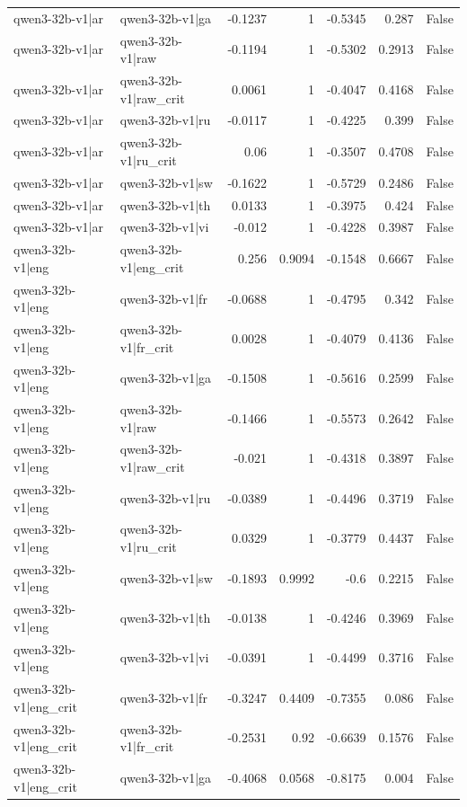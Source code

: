 \begin{table}
\begin{tabular}{l l r r r r l}
qwen3-32b-v1|ar & qwen3-32b-v1|ga & -0.1237 & 1 & -0.5345 & 0.287 & False \\
qwen3-32b-v1|ar & qwen3-32b-v1|raw & -0.1194 & 1 & -0.5302 & 0.2913 & False \\
qwen3-32b-v1|ar & qwen3-32b-v1|raw_crit & 0.0061 & 1 & -0.4047 & 0.4168 & False \\
qwen3-32b-v1|ar & qwen3-32b-v1|ru & -0.0117 & 1 & -0.4225 & 0.399 & False \\
qwen3-32b-v1|ar & qwen3-32b-v1|ru_crit & 0.06 & 1 & -0.3507 & 0.4708 & False \\
qwen3-32b-v1|ar & qwen3-32b-v1|sw & -0.1622 & 1 & -0.5729 & 0.2486 & False \\
qwen3-32b-v1|ar & qwen3-32b-v1|th & 0.0133 & 1 & -0.3975 & 0.424 & False \\
qwen3-32b-v1|ar & qwen3-32b-v1|vi & -0.012 & 1 & -0.4228 & 0.3987 & False \\
qwen3-32b-v1|eng & qwen3-32b-v1|eng_crit & 0.256 & 0.9094 & -0.1548 & 0.6667 & False \\
qwen3-32b-v1|eng & qwen3-32b-v1|fr & -0.0688 & 1 & -0.4795 & 0.342 & False \\
qwen3-32b-v1|eng & qwen3-32b-v1|fr_crit & 0.0028 & 1 & -0.4079 & 0.4136 & False \\
qwen3-32b-v1|eng & qwen3-32b-v1|ga & -0.1508 & 1 & -0.5616 & 0.2599 & False \\
qwen3-32b-v1|eng & qwen3-32b-v1|raw & -0.1466 & 1 & -0.5573 & 0.2642 & False \\
qwen3-32b-v1|eng & qwen3-32b-v1|raw_crit & -0.021 & 1 & -0.4318 & 0.3897 & False \\
qwen3-32b-v1|eng & qwen3-32b-v1|ru & -0.0389 & 1 & -0.4496 & 0.3719 & False \\
qwen3-32b-v1|eng & qwen3-32b-v1|ru_crit & 0.0329 & 1 & -0.3779 & 0.4437 & False \\
qwen3-32b-v1|eng & qwen3-32b-v1|sw & -0.1893 & 0.9992 & -0.6 & 0.2215 & False \\
qwen3-32b-v1|eng & qwen3-32b-v1|th & -0.0138 & 1 & -0.4246 & 0.3969 & False \\
qwen3-32b-v1|eng & qwen3-32b-v1|vi & -0.0391 & 1 & -0.4499 & 0.3716 & False \\
qwen3-32b-v1|eng_crit & qwen3-32b-v1|fr & -0.3247 & 0.4409 & -0.7355 & 0.086 & False \\
qwen3-32b-v1|eng_crit & qwen3-32b-v1|fr_crit & -0.2531 & 0.92 & -0.6639 & 0.1576 & False \\
qwen3-32b-v1|eng_crit & qwen3-32b-v1|ga & -0.4068 & 0.0568 & -0.8175 & 0.004 & False \\

\end{tabular}
\end{table}
